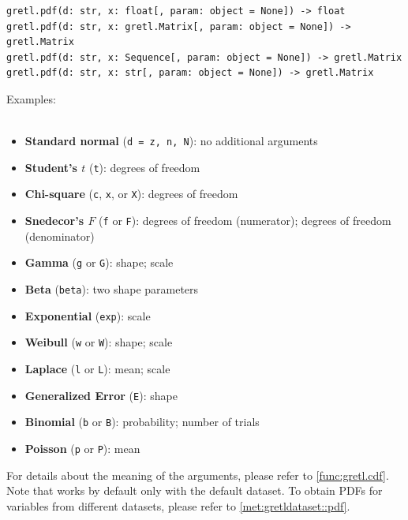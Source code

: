 \label{func:gretl.pdf}
\begin{lstlisting}[style=pythonstylefoot]
gretl.pdf(d: str, x: float[, param: object = None]) -> float
gretl.pdf(d: str, x: gretl.Matrix[, param: object = None]) -> gretl.Matrix
gretl.pdf(d: str, x: Sequence[, param: object = None]) -> gretl.Matrix
gretl.pdf(d: str, x: str[, param: object = None]) -> gretl.Matrix
\end{lstlisting}
Examples:\newline
{}\\
\\
\begin{footnotesize}\begin{itemize}
		\item \textbf{Standard normal} (\texttt{d = z, n, N}): no additional arguments
		\item \textbf{Student's $t$} (\texttt{t}): degrees of freedom
		\item \textbf{Chi-square} (\texttt{c}, \texttt{x}, or \texttt{X}): degrees of freedom
		\item \textbf{Snedecor's $F$} (\texttt{f} or \texttt{F}): degrees of freedom (numerator); degrees of freedom (denominator)
		\item \textbf{Gamma} (\texttt{g} or \texttt{G}): shape; scale
		\item \textbf{Beta} (\texttt{beta}): two shape parameters
		\item \textbf{Exponential} (\texttt{exp}): scale
		\item \textbf{Weibull} (\texttt{w} or \texttt{W}): shape; scale
		\item \textbf{Laplace} (\texttt{l} or \texttt{L}): mean; scale
		\item \textbf{Generalized Error} (\texttt{E}): shape
		\item \textbf{Binomial} (\texttt{b} or \texttt{B}): probability; number of trials
		\item \textbf{Poisson} (\texttt{p} or \texttt{P}): mean
\end{itemize}\end{footnotesize}
For details about the meaning of the arguments, please
refer to \ref{func:gretl.cdf}. Note that 
works by default only with the default dataset. To obtain PDFs
for variables from different datasets, please refer to \ref{met:gretldataset::pdf}.

